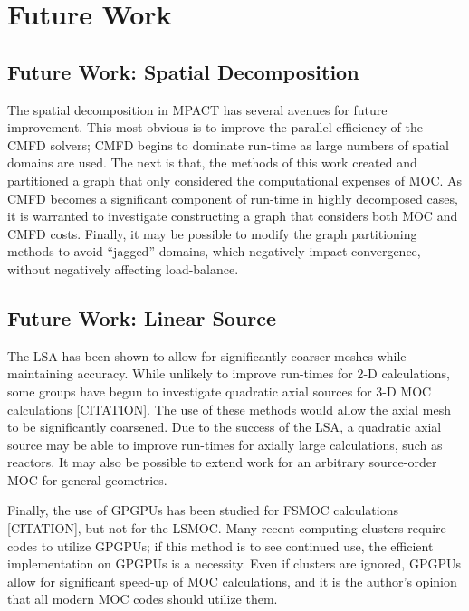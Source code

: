 {  \section{Future Work}{\label{sec:Future Work}

    \subsection{Future Work: Spatial Decomposition}{\label{ssec:Future Work:Spatial Decomposition}
      The spatial decomposition in MPACT has several avenues for future improvement.
      This most obvious is to improve the parallel efficiency of the \ac{CMFD} solvers; \ac{CMFD} begins to dominate run-time as large numbers of spatial domains are used.
      The next is that, the methods of this work created and partitioned a graph that only considered the computational expenses of \ac{MOC}.
      As \ac{CMFD} becomes a significant component of run-time in highly decomposed cases, it is warranted to investigate constructing a graph that considers both \ac{MOC} and \ac{CMFD} costs.
      Finally, it may be possible to modify the graph partitioning methods to avoid ``jagged'' domains, which negatively impact convergence, without negatively affecting load-balance.
    }

    \subsection{Future Work: Linear Source}{\label{ssec:Future Work:Linear Source}
      The \ac{LSA} has been shown to allow for significantly coarser meshes while maintaining accuracy.
      While unlikely to improve run-times for 2-D calculations, some groups have begun to investigate quadratic axial sources for 3-D \ac{MOC} calculations [CITATION].
      The use of these methods would allow the axial mesh to be significantly coarsened.
      Due to the success of the \ac{LSA}, a quadratic axial source may be able to improve run-times for axially large calculations, such as reactors.
      It may also be possible to extend  work for an arbitrary source-order \ac{MOC} for general geometries.

      Finally, the use of \acp{GPGPU} has been studied for \ac{FSMOC} calculations [CITATION], but not for the \ac{LSMOC}.
      Many recent computing clusters require codes to utilize \acp{GPGPU}; if this method is to see continued use, the efficient implementation on \acp{GPGPU} is a necessity.
      Even if clusters are ignored, \acp{GPGPU} allow for significant speed-up of \ac{MOC} calculations, and it is the author's opinion that all modern \ac{MOC} codes should utilize them.
    }

}}
